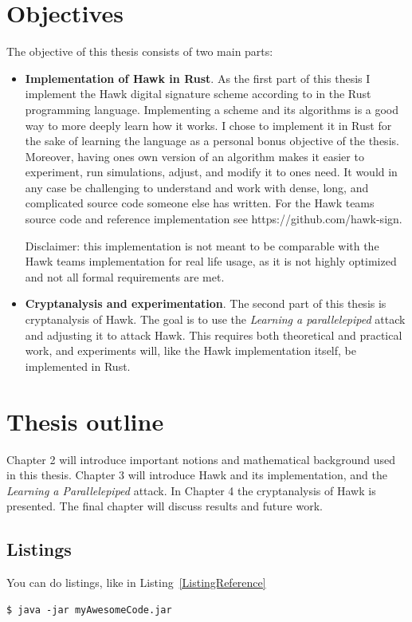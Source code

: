 \section{Objectives}
The objective of this thesis consists of two main parts:
\begin{itemize}
    \item \textbf{Implementation of Hawk in Rust}. As the first part of this thesis I implement the Hawk digital signature scheme according to \cite{HawkSpec24} in the Rust programming language. 
    Implementing a scheme and its algorithms is a good way to more deeply learn how it works. I chose to implement it in Rust for the sake of learning the language as a personal bonus objective of the thesis.
    Moreover, having ones own version of an algorithm makes it easier to experiment, run simulations, adjust, and modify it to ones need. It would in any case be challenging to understand and work with dense, long, 
    and complicated source code someone else has written. For the Hawk teams source code and reference implementation see https://github.com/hawk-sign.

    Disclaimer: this implementation is not meant to be comparable with the Hawk teams implementation for real life usage, as it is not highly optimized and not all formal requirements are met.

\item \textbf{Cryptanalysis and experimentation}. The second part of this thesis is cryptanalysis of Hawk. The goal is to use the \textit{Learning a parallelepiped} attack and adjusting it to attack Hawk. 
    This requires both theoretical and practical work, and experiments will, like the Hawk implementation itself, be implemented in Rust.
\end{itemize}
\section{Thesis outline}
Chapter 2 will introduce important notions and mathematical background used in this thesis. Chapter 3 will introduce Hawk and its implementation, and the \textit{Learning a Parallelepiped} attack.
In Chapter 4 the cryptanalysis of Hawk is presented. The final chapter will discuss results and future work.


\subsection{Listings}
You can do listings, like in Listing~\ref{ListingReference}
\begin{lstlisting}[caption={[Short caption]Look at this cool listing. Find the rest in Appendix~\ref{Listing}},label=ListingReference]
$ java -jar myAwesomeCode.jar
\end{lstlisting}

